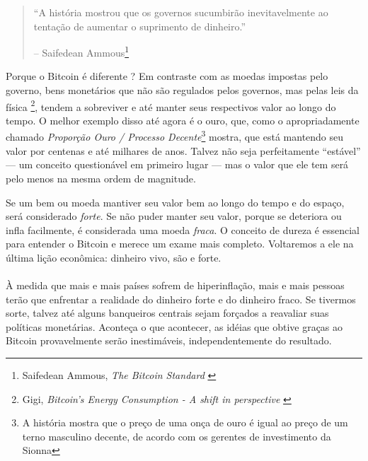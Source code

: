 \begin{quotation}\begin{samepage}
\enquote{A história mostrou que os governos sucumbirão inevitavelmente ao
tentação de aumentar o suprimento de dinheiro.}
\begin{flushright} -- Saifedean Ammous\footnote{Saifedean Ammous, \textit{The Bitcoin
Standard} \cite{bitcoin-standard}}
\end{flushright}\end{samepage}\end{quotation}

\newpage

Porque o Bitcoin é diferente ? Em contraste com as moedas impostas pelo governo,
bens monetários que não são regulados pelos governos, mas pelas leis da física
\footnote{Gigi, \textit{Bitcoin's Energy Consumption - A shift in
perspective} \cite{gigi:energy}}, tendem a sobreviver e até manter seus respectivos
valor ao longo do tempo. O melhor exemplo disso até agora é o ouro, que, como o
apropriadamente chamado \textit{Proporção Ouro / Processo Decente}\footnote{A história mostra que o
preço de uma onça de ouro é igual ao preço de um terno masculino decente, de acordo com os
gerentes de investimento da Sionna\cite{web:gold-to-decent-suite-ratio}} mostra, que está 
mantendo seu valor por centenas e até milhares de anos. Talvez não seja perfeitamente 
\enquote{estável} --- um conceito questionável em primeiro lugar ---  mas o valor que ele tem 
será pelo menos na mesma ordem de magnitude.

Se um bem ou moeda mantiver seu valor bem ao longo do tempo e do espaço, será considerado \textit{forte}. 
Se não puder manter seu valor, porque se deteriora ou infla facilmente, é considerada uma moeda \textit{fraca}. 
O conceito de dureza é essencial para entender o Bitcoin e merece um exame mais completo. Voltaremos a ele 
na última lição econômica: dinheiro vivo, são e forte.

\paragraph{}
À medida que mais e mais países sofrem de hiperinflação, mais e mais pessoas terão que enfrentar a 
realidade do dinheiro forte e do dinheiro fraco. Se tivermos sorte, talvez até alguns banqueiros 
centrais sejam forçados a reavaliar suas políticas monetárias. Aconteça o que acontecer, as idéias 
que obtive graças ao Bitcoin provavelmente serão inestimáveis, independentemente do resultado.

